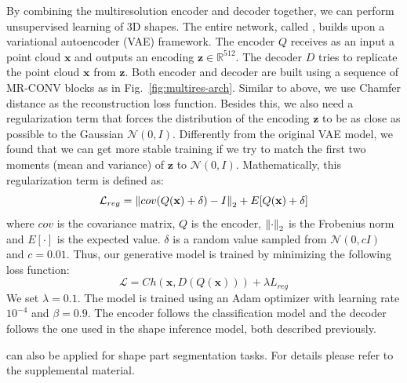  By combining the multiresolution encoder and decoder together, we can perform unsupervised learning of 3D shapes. The entire network, called \mrvae, builds upon a variational autoencoder (VAE) \cite{vae} framework. %
The encoder $Q$ receives as an input a point cloud $\mathbf{x}$ and outputs an encoding $\mathbf{z} \in \mathbb{R}^{512}$. The decoder $D$ tries to replicate the point cloud $\mathbf{x}$ from $\mathbf{z}$. Both encoder and decoder are built using a sequence of MR-CONV blocks as in Fig.~\ref{fig:multires-arch}. Similar to above, we use Chamfer distance as the reconstruction loss function. Besides this, we also need a regularization term that forces the distribution
of the encoding $\mathbf{z}$ to be as close as possible to the Gaussian $\mathcal{N}(0,I)$. Differently from the original VAE model, we found that we can get more stable training if we try to match the first two moments (mean and variance) of $\mathbf{z}$ to $\mathcal{N}(0,I)$. Mathematically, this regularization term is defined as:
\begin{equation}
	\mathcal{L}_{reg} = \left\lVert cov(Q(\mathbf{x}) + \delta) - I\right\rVert_2 + E[Q(\mathbf{x}) + \delta] \nonumber
\end{equation}
where $cov$ is the covariance matrix, $Q$ is the encoder, $\left\lVert\cdot\right\rVert_2$ is the Frobenius norm and $E[\cdot]$ is the
expected value.
$\delta$ is a random value sampled from $\mathcal{N}(0,cI)$ and $c=0.01$.
Thus, our generative model is trained by minimizing the following loss function:
\begin{equation}
	\mathcal{L} = Ch(\mathbf{x}, D(Q(\mathbf{x}))) + \lambda L_{reg} \nonumber
\end{equation}
We set $\lambda=0.1$. The model is trained using an Adam optimizer with learning rate $10^{-4}$ and $\beta = 0.9$.
The encoder follows the classification model and the decoder follows the one used in the shape inference model, both described previously.

 \mrtnet can also be applied for shape part segmentation tasks. For details please refer to the supplemental material.
